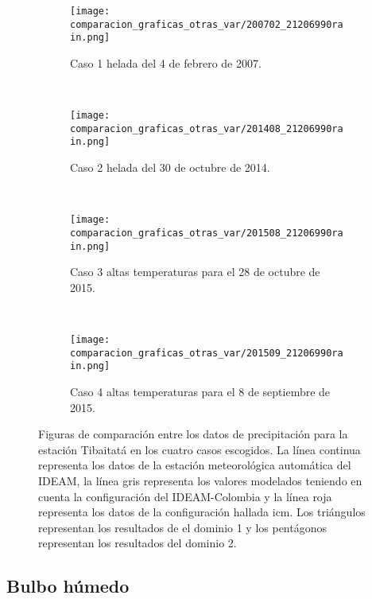 \begin{figure}[H]
    
\begin{subfigure}[normla]{0.4\textwidth}
\caption{Caso 1 helada del 4 de febrero de 2007.}
\label{caso1_tiba_wrf_prec}
\texttt{[image: comparacion\_graficas\_otras\_var/200702\_21206990rain.png]}
\end{subfigure}
~
\begin{subfigure}[normla]{0.4\textwidth}
\caption{Caso 2 helada del 30 de octubre de 2014.}
\label{caso2_tiba_wrf_prec}
\texttt{[image: comparacion\_graficas\_otras\_var/201408\_21206990rain.png]}
\end{subfigure}
~
\centering
\begin{subfigure}[normla]{0.4\textwidth}
\caption{Caso 3 altas temperaturas para el 28 de octubre de 2015.}
\label{caso3_tiba_wrf_prec}
\texttt{[image: comparacion\_graficas\_otras\_var/201508\_21206990rain.png]}
\end{subfigure}
~
\centering
\begin{subfigure}[normla]{0.4\textwidth}
\caption{Caso 4 altas temperaturas para el 8 de septiembre de 2015.}
\label{caso4_tiba_wrf_prec}
\texttt{[image: comparacion\_graficas\_otras\_var/201509\_21206990rain.png]}
\end{subfigure}

    \caption{Figuras de comparación entre los datos de precipitación para la estación Tibaitatá en los cuatro casos escogidos. La línea continua representa los datos de la estación meteorológica automática del IDEAM, la línea gris representa los valores modelados teniendo en cuenta la configuración del IDEAM-Colombia y la línea roja representa los datos de la configuración hallada icm. Los triángulos representan los resultados de el dominio 1 y los pentágonos representan los resultados del dominio 2.}
    \label{fig:wrf_prec_tibaitata}
\end{figure}


\subsection{Bulbo húmedo}

